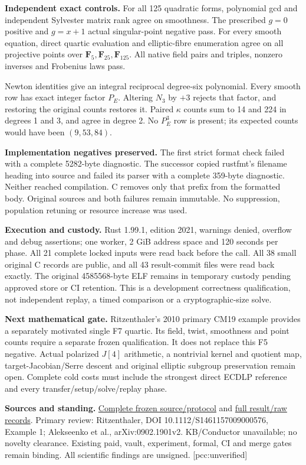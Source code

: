 \documentclass[10pt,a4paper]{article}
\begin{document}
\textbf{Independent exact controls.}
For all 125 quadratic forms, polynomial gcd and independent Sylvester
matrix rank agree on smoothness. The prescribed $g=0$ positive and
$g=x+1$ actual singular-point negative pass. For every smooth equation,
direct quartic evaluation and elliptic-fibre enumeration agree on all
projective points over $\mathbf F_5,\mathbf F_{25},\mathbf F_{125}$.
All native field pairs and triples, nonzero inverses and Frobenius laws pass.

Newton identities give an integral reciprocal degree-six polynomial.
Every smooth row has exact integer factor $P_E$. Altering $N_3$ by $+3$
rejects that factor, and restoring the original counts restores it. Paired
$\kappa$ counts sum to 14 and 224 in degrees 1 and 3, and agree in degree 2.
No $P_E^3$ row is present; its expected counts would have been $(9,53,84)$.

\textbf{Implementation negatives preserved.}
The first strict format check failed with a complete 5282-byte diagnostic.
The successor copied rustfmt's filename heading into source and failed its
parser with a complete 359-byte diagnostic. Neither reached compilation.
C removes only that prefix from the formatted body. Original sources and
both failures remain immutable. No suppression, population retuning or
resource increase was used.

\textbf{Execution and custody.}
Rust 1.99.1, edition 2021, warnings denied, overflow and debug assertions;
one worker, 2 GiB address space and 120 seconds per phase. All 21 complete
locked inputs were read back before the call. All 38 small original C
records are public, and all 43 result-commit files were read back exactly.
The original 4585568-byte ELF remains in temporary custody pending approved
store or CI retention. This is a development correctness qualification,
not independent replay, a timed comparison or a cryptographic-size solve.

\textbf{Next mathematical gate.}
Ritzenthaler's 2010 primary CM19 example provides a separately motivated
single F7 quartic. Its field, twist, smoothness and point counts require a
separate frozen qualification. It does not replace this F5 negative.
Actual polarized $J[4]$ arithmetic, a nontrivial kernel and quotient map,
target-Jacobian/Serre descent and original elliptic subgroup preservation
remain open. Complete cold costs must include the strongest direct ECDLP
reference and every transfer/setup/solve/replay phase.

\textbf{Sources and standing.}
\href{https://github.com/isogeny-labs/crypto/tree/b23c6582437e3e91d64690aedaf5481ad0ede025/research/chained_genus3_quartic_20261123}{Complete frozen source/protocol}
and
\href{https://github.com/isogeny-labs/crypto/tree/893f88068b6145dec9906a85d6582e5567a3e9b8/research/chained_genus3_quartic_20261123}{full result/raw records}.
Primary review: Ritzenthaler, DOI 10.1112/S1461157009000576, Example 1;
Alekseenko et al., arXiv:0902.1901v2. KB/Conductor unavailable; no novelty
clearance. Existing paid, vault, experiment, formal, CI and merge gates
remain binding. All scientific findings are unsigned. [pcc:unverified]
\end{document}
